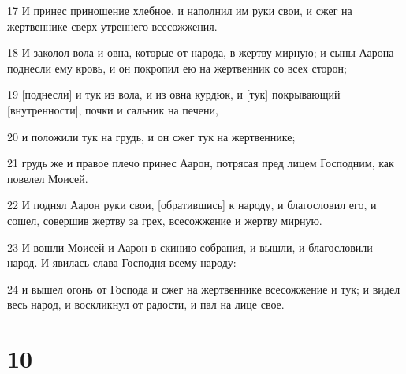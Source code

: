 \par 17 И принес приношение хлебное, и наполнил им руки свои, и сжег на жертвеннике сверх утреннего всесожжения.
\par 18 И заколол вола и овна, которые от народа, в жертву мирную; и сыны Аарона поднесли ему кровь, и он покропил ею на жертвенник со всех сторон;
\par 19 [поднесли] и тук из вола, и из овна курдюк, и [тук] покрывающий [внутренности], почки и сальник на печени,
\par 20 и положили тук на грудь, и он сжег тук на жертвеннике;
\par 21 грудь же и правое плечо принес Аарон, потрясая пред лицем Господним, как повелел Моисей.
\par 22 И поднял Аарон руки свои, [обратившись] к народу, и благословил его, и сошел, совершив жертву за грех, всесожжение и жертву мирную.
\par 23 И вошли Моисей и Аарон в скинию собрания, и вышли, и благословили народ. И явилась слава Господня всему народу:
\par 24 и вышел огонь от Господа и сжег на жертвеннике всесожжение и тук; и видел весь народ, и воскликнул от радости, и пал на лице свое.

\chapter{10}

